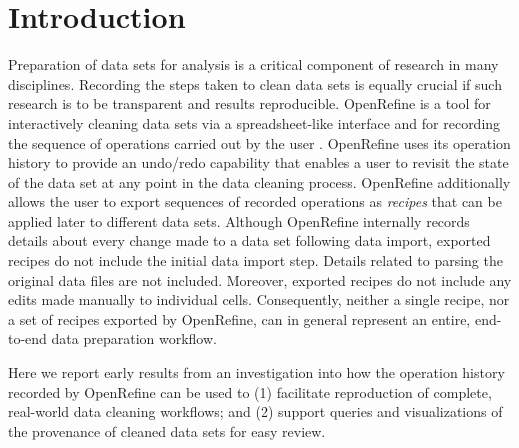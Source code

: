 \section{Introduction}

Preparation of data sets for analysis is a critical component of research in many disciplines. Recording the steps taken to clean data sets is equally crucial if such research is to be transparent and results reproducible. OpenRefine is a tool for interactively cleaning data sets via a spreadsheet-like interface and for recording the sequence of operations carried out by the user \cite{verborgh_using_2013}. OpenRefine uses its operation history to provide an undo/redo capability that enables a user to revisit the state of the data set at any point in the data cleaning process. OpenRefine additionally allows the user to export sequences of recorded operations as \emph{recipes} that can be applied later to different data sets. Although OpenRefine internally records details about every change made to a data set following data import, exported recipes do not include the initial data import step. Details related to parsing the original data files are not included. Moreover, exported recipes do not include any edits made manually to individual cells. Consequently, neither a single recipe, nor a set of recipes exported by OpenRefine, can in general represent an entire, end-to-end data preparation workflow. 

Here we report early results from an investigation into how the operation history recorded by OpenRefine can be used to (1) facilitate reproduction of complete, real-world data cleaning workflows; and (2) support queries and visualizations of the provenance of cleaned data sets for easy review.
